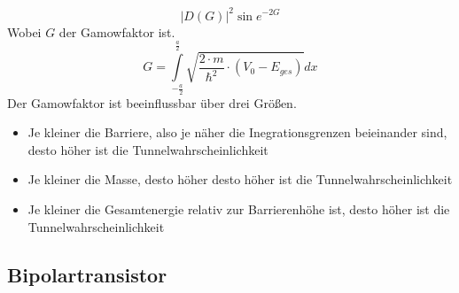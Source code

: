 \documentclass[12pt,a4paper]{report}%
\numberwithin{equation}{section}
\numberwithin{equation}{subsection}
\begin{document}
    \begin{equation}
      |D(G)|^2 \sin e^{-2G}
    \end{equation}
    Wobei $G$ der Gamowfaktor ist.
    \begin{equation}
      G = \int\limits_{-\frac{a}{2}}^{\frac{a}{2}} \sqrt{\frac{2\cdot m}{\hbar^2}\cdot (V_0 - E_{ges})}dx
    \end{equation}
    Der Gamowfaktor ist beeinflussbar über drei Größen. 
    \begin{itemize}
      \item Je kleiner die Barriere, also je näher die Inegrationsgrenzen beieinander sind, desto höher ist die Tunnelwahrscheinlichkeit
      \item Je kleiner die Masse, desto höher desto höher ist die Tunnelwahrscheinlichkeit
      \item Je kleiner die Gesamtenergie relativ zur Barrierenhöhe ist, desto höher ist die Tunnelwahrscheinlichkeit
    \end{itemize}
    
    \subsection{Bipolartransistor}
\end{document}
